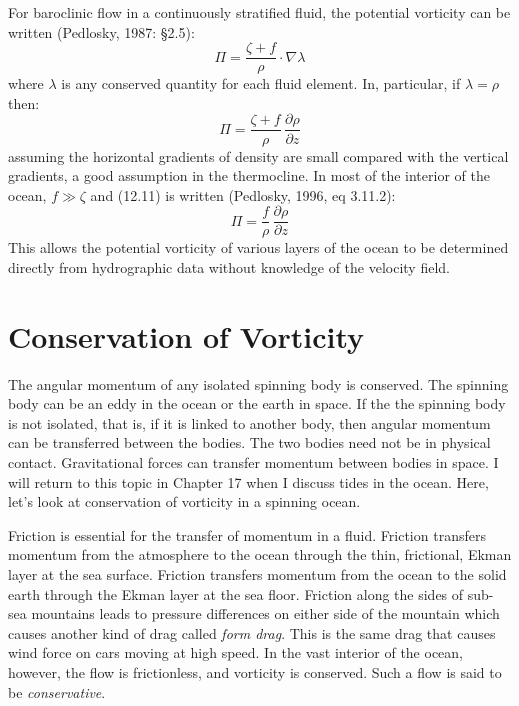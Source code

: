 For baroclinic flow in a continuously stratified fluid, the potential
vorticity can be written (Pedlosky, 1987: \S 2.5):
\begin{equation}
\Pi = \frac{\zeta + f}{\rho} \cdot \nabla \lambda
\end{equation}
where $\lambda$ is any conserved quantity for each fluid element. In,
particular, if $\lambda = \rho$ then:
\begin{equation}
\Pi = \frac{\zeta + f}{\rho}\,\frac{\partial{\rho}}{\partial{z}}
\end{equation}
assuming the horizontal gradients of density are small compared with
the vertical gradients, a good assumption in the
thermocline. In most of the interior of the ocean,
$f \gg \zeta$ and (12.11) is written (Pedlosky, 1996, eq 3.11.2):
\begin{equation}
\Pi = \frac{f}{\rho}\,\frac{\partial{\rho}}{\partial{z}}
\end{equation}
This allows the potential vorticity of various layers of the ocean to
be determined directly from hydrographic data without knowledge of the velocity
field.

\section{Conservation of Vorticity}
The angular momentum of any isolated
spinning body is conserved. The spinning body can be an eddy in the
ocean or the earth in space. If the the spinning body is not isolated,
that is, if it is linked to another body, then angular momentum can be
transferred between the bodies. The two bodies need not be in physical
contact. Gravitational forces can transfer momentum between bodies in
space.  I will return to this topic in Chapter 17 when I discuss tides
in the ocean. Here, let's look at conservation of vorticity in a
spinning ocean.

Friction is essential for the transfer of momentum in a
fluid. Friction transfers momentum from the atmosphere to the ocean
through the thin, frictional, Ekman layer at the sea
surface. Friction transfers momentum from the ocean
to the solid earth through the Ekman layer at the sea floor. Friction
along the sides of sub-sea mountains leads to pressure differences on
either side of the mountain which causes another kind of drag called
\textit{form drag}. This is the same drag that
causes wind force on cars moving at high speed. In the vast interior
of the ocean, however, the flow is frictionless, and vorticity is
conserved. Such a flow is said to be
\textit{conservative}.

